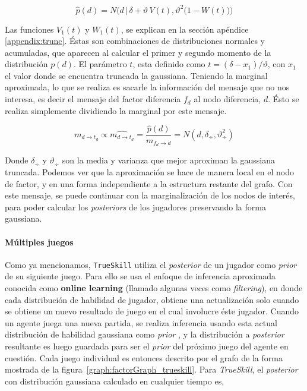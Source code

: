 \documentclass[11pt,twoside,spanish]{report} %
\begin{document}
\begin{equation}\label{eq:aprox}
\widehat{p}(d) = N\Bigg(d \,  \bigg| \,  \delta + \vartheta \, V(t) ,  \vartheta^2 \big( 1 - W(t) \big)  \Bigg)
\end{equation}



Las funciones $V_1(t)$ y $W_1(t)$, se explican en la secci\'on ap\'endice \ref{appendix:trunc}.
\'Estas son combinaciones de distribuciones normales y acumuladas, que aparecen al calcular el primer y segundo momento de la distribuci\'on $p(d)$.
El par\'ametro $t$, esta definido como $t = (\delta-x_1)/\vartheta$, con $x_1$ el valor donde se encuentra truncada la gaussiana.
Teniendo la marginal aproximada, lo que se realiza es sacarle la informaci\'on del mensaje que no nos interesa, es decir el mensaje del factor diferencia $f_d$ al nodo diferencia, $d$.
\'Esto se realiza simplemente dividiendo la marginal por este mensaje.

\begin{equation}\label{eq:aprox_}
 m_{d \rightarrow t_d} \propto\widehat{m_{d \rightarrow t_d}} = \frac{\widehat{p}(d)}{m_{f_d \rightarrow d}} = N(d,\delta_{\div},\vartheta_{\div}^2 )
\end{equation}

Donde $\delta_{\div}$ y $\vartheta_{\div}$ son la media y varianza que mejor aproximan la gaussiana truncada.
Podemos ver que la aproximaci\'on se hace de manera local en el nodo de factor, y en una forma independiente a la estructura restante del grafo.
Con este mensaje, se puede continuar con la marginalizaci\'on de los nodos de inter\'es, para poder calcular los \textit{posteriors} de los jugadores preservando la forma gaussiana.



\paragraph{M\'ultiples juegos}

Como ya mencionamos, \texttt{TrueSkill} utiliza el \textit{posterior} de un jugador como \textit{prior} de su siguiente juego.
Para ello se usa el enfoque de inferencia aproximada conocida como \textbf{online learning} (llamado algunas veces como \textit{filtering}), en donde cada distribuci\'on de habilidad de jugador, obtiene una actualizaci\'on solo cuando se obtiene un nuevo resultado de juego en el cual involucre \'este jugador.
Cuando un agente juega una nueva partida, se realiza inferencia usando esta actual distribuci\'on de habilidad gaussiana como \textit{prior} , y la distribuci\'on a \textit{posterior} resultante es luego guardada para ser el \textit{prior} del pr\'oximo juego del agente en cuesti\'on.
Cada juego individual es entonces descrito por el grafo de la forma mostrada de la figura~\ref{graph:factorGraph_trueskill}.
Para \textit{TrueSkill}, el \textit{posterior} con distribuci\'on gaussiana calculado en cualquier tiempo es,
 
\end{document}
